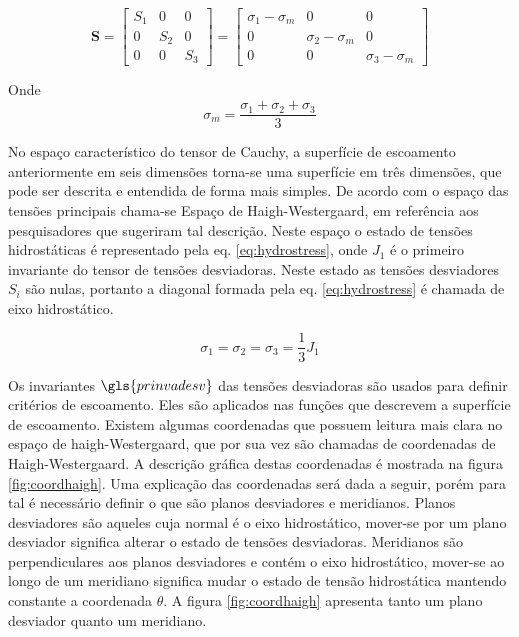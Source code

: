 \begin{equation}
\boldsymbol{S} = 
    \begin{bmatrix}
    S_1 & 0 & 0 \\
    0 & S_2 & 0 \\
    0 & 0 & S_3
    \end{bmatrix} = \begin{bmatrix}
    \sigma_1 - \sigma_m & 0 & 0 \\
    0 & \sigma_2 - \sigma_m & 0 \\
    0 & 0 & \sigma_3 - \sigma_m
    \end{bmatrix}
\end{equation}

Onde 
\begin{equation}
     \sigma_m = \frac{\sigma_1 + \sigma_2 + \sigma_3}{3}
\end{equation}

No espaço característico do tensor de Cauchy, a superfície de escoamento anteriormente em seis dimensões torna-se uma superfície em três dimensões, que pode ser descrita e entendida de forma mais simples. De acordo com \cite{hiermaier_2008} o espaço das tensões principais chama-se Espaço de Haigh-Westergaard, em referência aos pesquisadores que sugeriram tal descrição. Neste espaço o estado de tensões hidrostáticas é representado pela eq. \ref{eq:hydrostress}, onde $ J_1 $ é o primeiro invariante do tensor de tensões desviadoras. Neste estado as tensões desviadores $S_i$ são nulas, portanto a diagonal formada pela eq. \ref{eq:hydrostress} é chamada de eixo hidrostático.  

\begin{equation} \label{eq:hydrostress}
    \sigma_1 = \sigma_2 = \sigma_3 = \frac{1}{3} J_1
\end{equation}

Os invariantes $\gls{prinvadesv}$ das tensões desviadoras são usados para definir critérios de escoamento. Eles são aplicados nas funções que descrevem a superfície de escoamento. Existem algumas coordenadas que possuem leitura mais clara no espaço de haigh-Westergaard, que por sua vez são chamadas de coordenadas de Haigh-Westergaard. A descrição gráfica destas coordenadas é mostrada na figura \ref{fig:coordhaigh}. Uma explicação das coordenadas será dada a seguir, porém para tal é necessário definir o que são planos desviadores e meridianos. Planos desviadores são aqueles cuja normal é o eixo hidrostático, mover-se por um plano desviador significa alterar o estado de tensões desviadoras. Meridianos são perpendiculares aos planos desviadores e contém o eixo hidrostático, mover-se ao longo de um meridiano significa mudar o estado de tensão hidrostática mantendo constante a coordenada $\theta$. A figura \ref{fig:coordhaigh} apresenta tanto um plano desviador quanto um meridiano. \\

